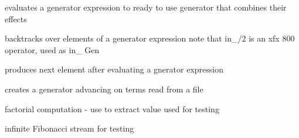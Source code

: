 \documentclass[11pt]{article}
\begin{document}
\begin{description}
evaluates a generator expression to ready to use
generator that combines their effects

backtracks over elements of a generator expression
note that in_/2 is an xfx 800 operator, used as  in_ Gen

produces next element after evaluating a gnerator expression

creates a generator advancing on terms read from a file

factorial computation - use  to extract value
used for testing

infinite Fibonacci stream for testing
\end{description}


\printindex
\end{document}
